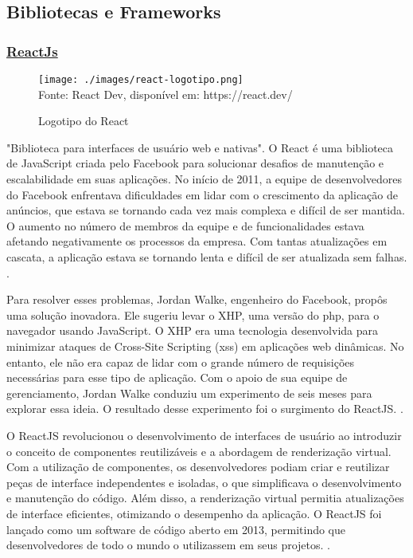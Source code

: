 \subsection{Bibliotecas e Frameworks}

\subsubsection{\underline{ReactJs}}

\begin{figure}[H]
    \centering
    \caption{Logotipo do React}
    \texttt{[image: ./images/react-logotipo.png]}
    \label{fig:react-logotipo} \\
    \textnormal{\fontsize{10pt}{12pt}Fonte: React Dev, disponível em: https://react.dev/}
\end{figure}

"Biblioteca para interfaces de usuário \acrshort{web} e nativas".
O React é uma biblioteca de JavaScript criada pelo Facebook para solucionar
desafios de manutenção e escalabilidade em suas aplicações. No início de 2011, a equipe de
desenvolvedores do Facebook enfrentava dificuldades em lidar com o crescimento da
aplicação de anúncios, que estava se tornando cada vez mais complexa e difícil de ser
mantida. O aumento no número de membros da equipe e de funcionalidades estava afetando
negativamente os processos da empresa. Com tantas atualizações em cascata, a aplicação
estava se tornando lenta e difícil de ser atualizada sem falhas.
\cite{morais-react}.

Para resolver esses problemas, Jordan Walke, engenheiro do Facebook, propôs uma
solução inovadora. Ele sugeriu levar o 
XHP,
uma versão do
\acrshort{php},
para o navegador usando
JavaScript. O 
XHP
era uma tecnologia desenvolvida para minimizar ataques de Cross-Site
Scripting
(\acrshort{xss})
em aplicações
\acrshort{web}
dinâmicas. No entanto, ele não era capaz de lidar com o
grande número de requisições necessárias para esse tipo de aplicação. Com o apoio de sua
equipe de gerenciamento, Jordan Walke conduziu um experimento de seis meses para
explorar essa ideia. O resultado desse experimento foi o surgimento do ReactJS.
\cite{morais-react}.

O ReactJS revolucionou o desenvolvimento de interfaces de usuário ao introduzir o
conceito de componentes reutilizáveis e a abordagem de renderização virtual. Com a
utilização de componentes, os desenvolvedores podiam criar e reutilizar peças de interface
independentes e isoladas, o que simplificava o desenvolvimento e manutenção do código.
Além disso, a renderização virtual permitia atualizações de interface eficientes, otimizando o
desempenho da aplicação. O ReactJS foi lançado como um software de código aberto em
2013, permitindo que desenvolvedores de todo o mundo o utilizassem em seus projetos.
\cite{morais-react}.

